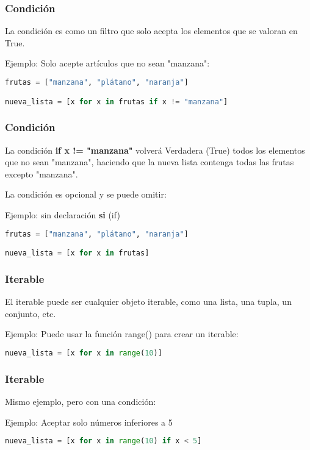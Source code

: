\begin{frame}[fragile]
  \frametitle{Condición}

  La condición es como un filtro que solo acepta los
  elementos que se valoran en True.

  \vspace{\baselineskip}
  Ejemplo: Solo acepte artículos que no sean "manzana":
  \begin{lstlisting}[language=Python]
frutas = ["manzana", "plátano", "naranja"]

nueva_lista = [x for x in frutas if x != "manzana"]
  \end{lstlisting}
\end{frame}

\begin{frame}[fragile]
  \frametitle{Condición}
  La condición \textbf{if x != "manzana"}  volverá Verdadera (True)
  todos los elementos que no sean "manzana", haciendo que la nueva
  lista contenga todas las frutas excepto "manzana".

  La condición es opcional y se puede omitir:

  \vspace{\baselineskip}
  Ejemplo: sin declaración \textbf{si} (if)
  \begin{lstlisting}[language=Python]
frutas = ["manzana", "plátano", "naranja"]

nueva_lista = [x for x in frutas]
  \end{lstlisting}
\end{frame}

\begin{frame}[fragile]
  \frametitle{Iterable}

  El iterable puede ser cualquier objeto iterable,
  como una lista, una tupla, un conjunto, etc.

  \vspace{\baselineskip}
  Ejemplo: Puede usar la función range() para crear un iterable:
  \begin{lstlisting}[language=Python]
nueva_lista = [x for x in range(10)]
  \end{lstlisting}
\end{frame}

\begin{frame}[fragile]
  \frametitle{Iterable}

  Mismo ejemplo, pero con una condición:

  \vspace{\baselineskip}
  Ejemplo: Aceptar solo números inferiores a 5
  \begin{lstlisting}[language=Python]
nueva_lista = [x for x in range(10) if x < 5]
  \end{lstlisting}
\end{frame}

